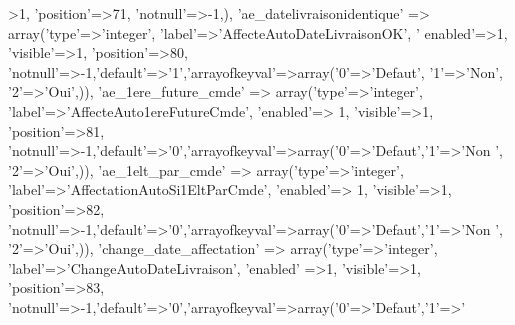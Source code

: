 \begin{DoxyCode}
      >1, \textcolor{stringliteral}{'position'}=>71, \textcolor{stringliteral}{'notnull'}=>-1,),
        \textcolor{stringliteral}{'ae\_datelivraisonidentique'} => array(\textcolor{stringliteral}{'type'}=>\textcolor{stringliteral}{'integer'}, \textcolor{stringliteral}{'label'}=>\textcolor{stringliteral}{'AffecteAutoDateLivraisonOK'}, \textcolor{stringliteral}{'
      enabled'}=>1, \textcolor{stringliteral}{'visible'}=>1, \textcolor{stringliteral}{'position'}=>80, \textcolor{stringliteral}{'notnull'}=>-1,\textcolor{stringliteral}{'default'}=>\textcolor{charliteral}{'1'},\textcolor{stringliteral}{'arrayofkeyval'}=>array(\textcolor{charliteral}{'0'}=>\textcolor{stringliteral}{'Defaut'},\textcolor{charliteral}{
      '1'}=>\textcolor{stringliteral}{'Non'}, \textcolor{charliteral}{'2'}=>\textcolor{stringliteral}{'Oui'},)),
        \textcolor{stringliteral}{'ae\_1ere\_future\_cmde'} => array(\textcolor{stringliteral}{'type'}=>\textcolor{stringliteral}{'integer'}, \textcolor{stringliteral}{'label'}=>\textcolor{stringliteral}{'AffecteAuto1ereFutureCmde'}, \textcolor{stringliteral}{'enabled'}=>
      1, \textcolor{stringliteral}{'visible'}=>1, \textcolor{stringliteral}{'position'}=>81, \textcolor{stringliteral}{'notnull'}=>-1,\textcolor{stringliteral}{'default'}=>\textcolor{charliteral}{'0'},\textcolor{stringliteral}{'arrayofkeyval'}=>array(\textcolor{charliteral}{'0'}=>\textcolor{stringliteral}{'Defaut'},\textcolor{charliteral}{'1'}=>\textcolor{stringliteral}{'Non
      '}, \textcolor{charliteral}{'2'}=>\textcolor{stringliteral}{'Oui'},)),
        \textcolor{stringliteral}{'ae\_1elt\_par\_cmde'} => array(\textcolor{stringliteral}{'type'}=>\textcolor{stringliteral}{'integer'}, \textcolor{stringliteral}{'label'}=>\textcolor{stringliteral}{'AffectationAutoSi1EltParCmde'}, \textcolor{stringliteral}{'enabled'}=>
      1, \textcolor{stringliteral}{'visible'}=>1, \textcolor{stringliteral}{'position'}=>82, \textcolor{stringliteral}{'notnull'}=>-1,\textcolor{stringliteral}{'default'}=>\textcolor{charliteral}{'0'},\textcolor{stringliteral}{'arrayofkeyval'}=>array(\textcolor{charliteral}{'0'}=>\textcolor{stringliteral}{'Defaut'},\textcolor{charliteral}{'1'}=>\textcolor{stringliteral}{'Non
      '}, \textcolor{charliteral}{'2'}=>\textcolor{stringliteral}{'Oui'},)),
        \textcolor{stringliteral}{'change\_date\_affectation'} => array(\textcolor{stringliteral}{'type'}=>\textcolor{stringliteral}{'integer'}, \textcolor{stringliteral}{'label'}=>\textcolor{stringliteral}{'ChangeAutoDateLivraison'}, \textcolor{stringliteral}{'enabled'}
      =>1, \textcolor{stringliteral}{'visible'}=>1, \textcolor{stringliteral}{'position'}=>83, \textcolor{stringliteral}{'notnull'}=>-1,\textcolor{stringliteral}{'default'}=>\textcolor{charliteral}{'0'},\textcolor{stringliteral}{'arrayofkeyval'}=>array(\textcolor{charliteral}{'0'}=>\textcolor{stringliteral}{'Defaut'},\textcolor{charliteral}{'1'}=>\textcolor{stringliteral}{'
}
\end{DoxyCode}
